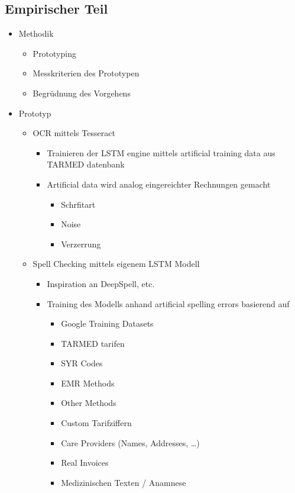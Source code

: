 \documentclass{hwz}
\begin{document}
\subsection{Empirischer Teil}
\begin{itemize}
    \item Methodik
    \begin{itemize}
		\item Prototyping
		\item Messkriterien des Prototypen
		\item Begrüdnung des Vorgehens
    \end{itemize}
	\item Prototyp
    \begin{itemize}
		\item OCR mittels Tesseract
        \begin{itemize}
			\item Trainieren der LSTM engine mittels artificial training data aus TARMED datenbank
			\item Artificial data wird analog eingereichter Rechnungen gemacht
            \begin{itemize}
				\item Schrfitart
				\item Noise
				\item Verzerrung
            \end{itemize}
        \end{itemize}
	    \item Spell Checking mittels eigenem LSTM Modell
        \begin{itemize}
		    \item Inspiration an DeepSpell, etc.
		    \item Training des Modells anhand artificial spelling errors basierend auf
            \begin{itemize}
				\item Google Training Datasets
				\item TARMED tarifen
				\item SYR Codes
				\item EMR Methods
				\item Other Methods
				\item Custom Tarifziffern
				\item Care Providers (Names, Addresses, …)
				\item Real Invoices
				\item Medizinischen Texten / Anamnese
            \end{itemize}

\end{itemize}
\end{itemize}
\end{itemize}
\end{document}
